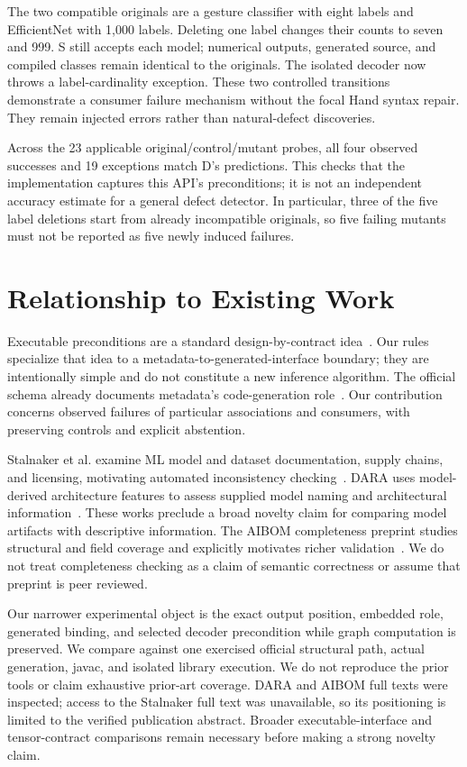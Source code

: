 \documentclass[10pt,twocolumn,letterpaper]{article}
\begin{document}
The two compatible originals are a gesture classifier with eight labels and EfficientNet with 1,000 labels. Deleting one label changes their counts to seven and 999. S still accepts each model; numerical outputs, generated source, and compiled classes remain identical to the originals. The isolated decoder now throws a label-cardinality exception. These two controlled transitions demonstrate a consumer failure mechanism without the focal Hand syntax repair. They remain injected errors rather than natural-defect discoveries.

Across the 23 applicable original/control/mutant probes, all four observed successes and 19 exceptions match D's predictions. This checks that the implementation captures this API's preconditions; it is not an independent accuracy estimate for a general defect detector. In particular, three of the five label deletions start from already incompatible originals, so five failing mutants must not be reported as five newly induced failures.

\section{Relationship to Existing Work}
Executable preconditions are a standard design-by-contract idea~\cite{meyer}. Our rules specialize that idea to a metadata-to-generated-interface boundary; they are intentionally simple and do not constitute a new inference algorithm. The official schema already documents metadata's code-generation role~\cite{schema}. Our contribution concerns observed failures of particular associations and consumers, with preserving controls and explicit abstention.

Stalnaker et al. examine ML model and dataset documentation, supply chains, and licensing, motivating automated inconsistency checking~\cite{stalnaker}. DARA uses model-derived architecture features to assess supplied model naming and architectural information~\cite{dara}. These works preclude a broad novelty claim for comparing model artifacts with descriptive information. The AIBOM completeness preprint studies structural and field coverage and explicitly motivates richer validation~\cite{aibom}. We do not treat completeness checking as a claim of semantic correctness or assume that preprint is peer reviewed.

Our narrower experimental object is the exact output position, embedded role, generated binding, and selected decoder precondition while graph computation is preserved. We compare against one exercised official structural path, actual generation, javac, and isolated library execution. We do not reproduce the prior tools or claim exhaustive prior-art coverage. DARA and AIBOM full texts were inspected; access to the Stalnaker full text was unavailable, so its positioning is limited to the verified publication abstract. Broader executable-interface and tensor-contract comparisons remain necessary before making a strong novelty claim.
\end{document}
